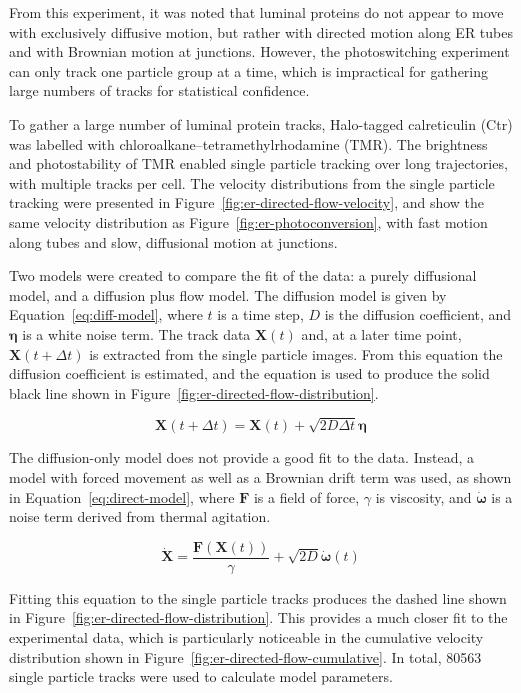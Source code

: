 From this experiment, it was noted that luminal proteins do not appear to move with exclusively diffusive motion, but rather with directed motion along ER tubes and with Brownian motion at junctions. 
However, the photoswitching experiment can only track one particle group at a time, which is impractical for gathering large numbers of tracks for statistical confidence. 

To gather a large number of luminal protein tracks, Halo-tagged calreticulin (Ctr) was labelled with chloroalkane–tetramethylrhodamine (TMR). 
The brightness and photostability of TMR enabled single particle tracking over long trajectories, with multiple tracks per cell. 
The velocity distributions from the single particle tracking were presented in Figure~\ref{fig:er-directed-flow-velocity}, and show the same velocity distribution as Figure~\ref{fig:er-photoconversion}, with fast motion along tubes and slow, diffusional motion at junctions. 

Two models were created to compare the fit of the data: a purely diffusional model, and a diffusion plus flow model. 
The diffusion model is given by Equation~\ref{eq:diff-model}, where $t$ is a time step, $D$ is the diffusion coefficient, and $\mathbf{\eta}$ is a white noise term. The track data $\mathbf{X}(t)$ and, at a later time point, $\mathbf{X}(t + \Delta t)$ is extracted from the single particle images. 
From this equation the diffusion coefficient is estimated, and the equation is used to produce the solid black line shown in Figure~\ref{fig:er-directed-flow-distribution}. 

\begin{equation} \label{eq:diff-model}
\mathbf{X}(t + \Delta t) = \mathbf{X}(t) + \sqrt{2D\Delta t}\mathbf{\eta}
\end{equation}

The diffusion-only model does not provide a good fit to the data. 
Instead, a model with forced movement as well as a Brownian drift term was used, as shown in Equation~\ref{eq:direct-model}, where $\mathbf{F}$ is a field of force, $\gamma$ is viscosity, and $\mathbf{\dot{\omega}}$ is a noise term derived from thermal agitation.

\begin{equation} \label{eq:direct-model}
\mathbf{\dot{X}} = \frac{\mathbf{F}(\mathbf{X}(t))}{\gamma} + \sqrt{2D}\mathbf{\dot{\omega}}(t)
\end{equation}

Fitting this equation to the single particle tracks produces the dashed line shown in Figure~\ref{fig:er-directed-flow-distribution}. 
This provides a much closer fit to the experimental data, which is particularly noticeable in the cumulative velocity distribution shown in Figure~\ref{fig:er-directed-flow-cumulative}.
In total, \num{80563} single particle tracks were used to calculate model parameters. 

